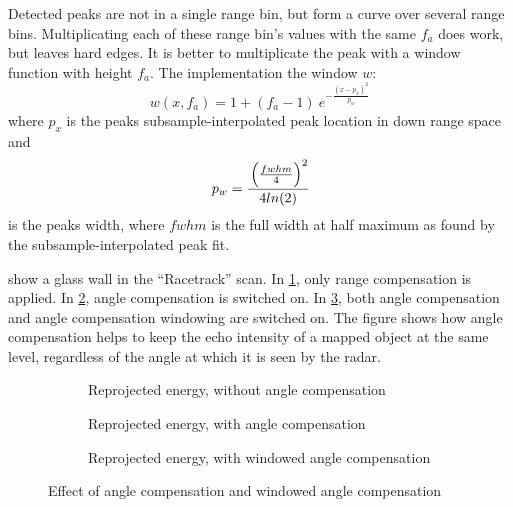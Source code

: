 Detected peaks are not in a single range bin, but form a curve over
several range bins. Multiplicating each of these range bin's values with
the same \(f_a\) does work, but leaves hard edges. It is better to
multiplicate the peak with a window function with height \(f_a\). The
implementation the window \(w\):
\[
w(x,f_a) = 1 + (f_a - 1) ~e ^ { -\frac{ \left( {x - p_x} \right) ^ 2 } {p_w} }
\] where \(p_x\) is the peaks subsample-interpolated peak location in
down range space and
\[
p_w = \cfrac{
\left( \frac{fwhm}{4}  \right) ^2
}{
4 ln(2)}
\]
is
the peaks width, where \(fwhm\) is the full width at half maximum as
found by the subsample-interpolated peak fit.

 show a glass wall in the ``Racetrack'' scan. In \cref{fig:fig_angle_compensation_comparison_1}, only range compensation is applied. In \cref{fig:fig_angle_compensation_comparison_2},
angle compensation is switched on. In \cref{fig:fig_angle_compensation_comparison_3}, both angle
compensation and angle compensation windowing are switched on. The
figure shows how angle compensation helps to keep the echo intensity of
a mapped object at the same level, regardless of the angle at which it
is seen by the radar.

\begin{figure}[htbp]
    \centering
    \begin{subfigure}{\textwidth}
        \centering
        \def\svgscale{0.8} \small
        
        \caption{Reprojected energy, without angle compensation}
        \label{fig:fig_angle_compensation_comparison_1}
        \bigskip
    \end{subfigure}
    \begin{subfigure}{\textwidth}
        \centering
        \def\svgscale{0.8} \small
        
        \caption{Reprojected energy, with angle compensation}
        \label{fig:fig_angle_compensation_comparison_2}
        \bigskip
    \end{subfigure}
    \begin{subfigure}{\textwidth}
        \centering
        \def\svgscale{0.8} \small
        
        \caption{Reprojected energy, with windowed angle compensation}
        \label{fig:fig_angle_compensation_comparison_3}
        \bigskip
    \end{subfigure}
    \caption{Effect of angle compensation and windowed angle compensation}
    \label{fig:fig_angle_compensation_comparison}
\end{figure}
